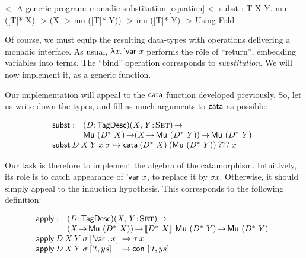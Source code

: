 \begin{wstructure}
<- A generic program: monadic substitution [equation]
    <- subst : \forall T X Y. mu ([T]* X) -> (X -> mu ([T]* Y)) -> mu ([T]* Y)
        -> Using Fold
\end{wstructure}

Of course, we must equip the resulting data-types with operations
delivering a monadic interface. As usual, \(\LAM{\x}\DVar{\x}\)
performs the r\^ole of ``return'', embedding variables into terms. The
``bind'' operation corresponds to \emph{substitution}. We will now
implement it, as a generic function.

Our implementation will appeal to the $\cata$ function developed
previously. So, let us write down the types, and fill as much
arguments to $\cata$ as possible:

\newcommand{\subst}{\F{subst}}
\newcommand{\apply}{\F{apply}}


\[\stk{
\begin{array}{@{}ll}
\subst : & \PITEL{\V{D}}{\TagDesc}
           \PI{\V{X}, \V{Y}}{\Set} \\
         & \Mu{(\FreeMonad{D}{X})} \To
           (\V{X} \To \Mu{(\FreeMonad{D}{Y})}) \To
           \Mu{(\FreeMonad{D}{Y})} 
\end{array} \\
\subst\: D\: X\: Y\: x\: \sigma \mapsto
  \cata\: (\FreeMonad{D}{X})\: (\Mu{(\FreeMonad{D}{Y})})\: ???\: x
}\]

Our task is therefore to implement the algebra of the
catamorphism. Intuitively, its role is to catch appearance of
$\DVar{x}$, to replace it by $\sigma x$. Otherwise, it should simply
appeal to the induction hypothesis. This corresponds to the following
definition:

\[\stk{
\begin{array}{@{}ll}
\apply : & \PITEL{\V{D}}{\TagDesc} 
           \PI{\V{X}, \V{Y}}{\Set} \\
         & (\V{X} \To \Mu{(\FreeMonad{D}{X})}) \To
           \descop{\FreeMonad{D}{X}}{\Mu{(\FreeMonad{D}{Y})}} \To
           \Mu{(\FreeMonad{D}{Y})}                            \\
\end{array} \\
\begin{array}{@{}l@{\:\:\mapsto\:}l}
\apply\: D\: X\: Y\: \sigma\: \pair{\DVar{}}{x}{}     & \sigma\: x                   \\
\apply\: D\: X\: Y\: \sigma\: \pair{\etag{t}}{ys}{} & \Con{\pair{\etag{t}}{ys}{}}
\end{array}
}\]

